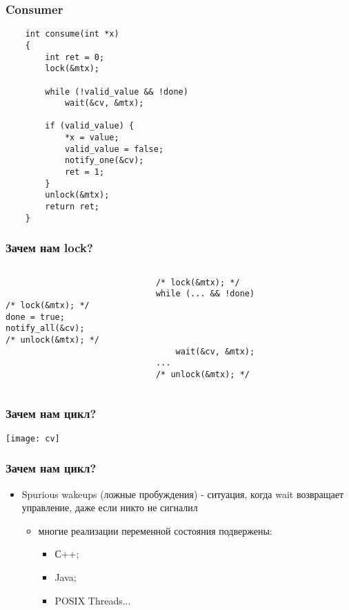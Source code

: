 \begin{frame}[fragile]
\frametitle{Consumer}
\begin{lstlisting}
    int consume(int *x)
    {
        int ret = 0;
        lock(&mtx);

        while (!valid_value && !done)
            wait(&cv, &mtx);

        if (valid_value) {
            *x = value;
            valid_value = false;
            notify_one(&cv);
            ret = 1;
        }
        unlock(&mtx);
        return ret;
    }
\end{lstlisting}
\end{frame}

\begin{frame}[fragile]
\frametitle{Зачем нам lock?}
\begin{columns}
    \begin{column}{.4\textwidth}
        \begin{lstlisting}


/* lock(&mtx); */
done = true;
notify_all(&cv);
/* unlock(&mtx); */



        \end{lstlisting}
    \end{column}
    \begin{column}{.4\textwidth}
        \begin{lstlisting}
/* lock(&mtx); */
while (... && !done)




    wait(&cv, &mtx);
...
/* unlock(&mtx); */
        \end{lstlisting}
    \end{column}
    \begin{column}{.2\textwidth}
    \end{column}
\end{columns}
\end{frame}

\begin{frame}
\frametitle{Зачем нам цикл?}
\texttt{[image: cv]}
\end{frame}

\begin{frame}
\frametitle{Зачем нам цикл?}
\begin{itemize}
    \item<1->Spurious wakeups (ложные пробуждения) - ситуация, когда wait
         возвращает управление, даже если никто не сигналил
    \begin{itemize}
        \item<2->многие реализации переменной состояния подвержены:
        \begin{itemize}
            \item<3->С++;
            \item<4->Java;
            \item<5->POSIX Threads...
        \end{itemize}
    \end{itemize}
\end{itemize}
\end{frame}
